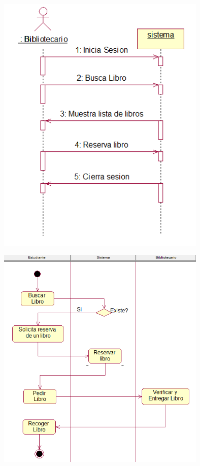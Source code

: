 \begin{enumerate}[1.]
	\begin{center}
	\includegraphics[width=10cm]{./Imagenes/img5} 
	\end{center}
	
	\begin{center}
	\includegraphics[width=10cm]{./Imagenes/img6} 
	\end{center}
	

\end{enumerate}
